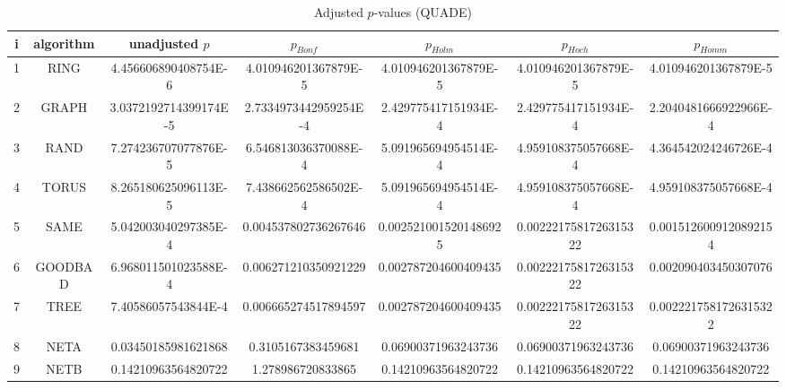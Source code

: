\documentclass[a4paper,10pt]{article}
\begin{document}
\begin{landscape}
\begin{table}[!htp]
\centering\scriptsize
\caption{Adjusted $p$-values (QUADE)}
\begin{tabular}{ccccccc}
i&algorithm&unadjusted $p$&$p_{Bonf}$&$p_{Holm}$&$p_{Hoch}$&$p_{Homm}$\\
\hline
1& RING&4.456606890408754E-6&4.010946201367879E-5&4.010946201367879E-5&4.010946201367879E-5&4.010946201367879E-5\\
2& GRAPH&3.0372192714399174E-5&2.7334973442959254E-4&2.429775417151934E-4&2.429775417151934E-4&2.2040481666922966E-4\\
3& RAND&7.274236707077876E-5&6.546813036370088E-4&5.091965694954514E-4&4.959108375057668E-4&4.364542024246726E-4\\
4& TORUS&8.265180625096113E-5&7.438662562586502E-4&5.091965694954514E-4&4.959108375057668E-4&4.959108375057668E-4\\
5& SAME&5.042003040297385E-4&0.004537802736267646&0.0025210015201486925&0.0022217581726315322&0.0015126009120892154\\
6& GOODBAD&6.968011501023588E-4&0.006271210350921229&0.002787204600409435&0.0022217581726315322&0.002090403450307076\\
7& TREE&7.40586057543844E-4&0.006665274517894597&0.002787204600409435&0.0022217581726315322&0.0022217581726315322\\
8& NETA&0.03450185981621868&0.3105167383459681&0.06900371963243736&0.06900371963243736&0.06900371963243736\\
9& NETB&0.14210963564820722&1.278986720833865&0.14210963564820722&0.14210963564820722&0.14210963564820722\\
\hline
\end{tabular}
\end{table}


\end{landscape}
\end{document}
